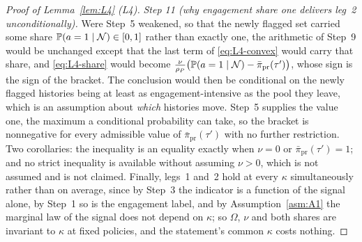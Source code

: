\begin{proof}[Proof of Lemma~\ref{lem:L4} (L4)]
\emph{Step 11 (why engagement share one delivers leg~2 unconditionally).} Were Step~5 weakened, so
that the newly flagged set carried some share $\mathbb{P}(a=1\mid\mathcal N) \in [0,1]$ rather than exactly
one, the arithmetic of Step~9 would be unchanged except that the last term of \eqref{eq:L4-convex}
would carry that share, and \eqref{eq:L4-share} would become
$\tfrac{\nu}{\rho_P}\bigl(\mathbb{P}(a=1\mid\mathcal N)-\bar\pi_{\mathrm{pr}}(\tau')\bigr)$, whose sign is
the sign of the bracket. The conclusion would then be conditional on the newly flagged histories
being at least as engagement-intensive as the pool they leave, which is an assumption about
\emph{which} histories move. Step~5 supplies the value one, the maximum a conditional probability can
take, so the bracket is nonnegative for every admissible value of $\bar\pi_{\mathrm{pr}}(\tau')$ with
no further restriction. Two corollaries: the inequality is an equality exactly when $\nu = 0$ or
$\bar\pi_{\mathrm{pr}}(\tau') = 1$; and no strict inequality is available without assuming
$\nu > 0$, which is not assumed and is not claimed. Finally, legs~1 and~2 hold at every $\kappa$
simultaneously rather than on average, since by Step~3 the indicator is a function of the signal
alone, by Step~1 so is the engagement label, and by Assumption~\ref{asm:A1} the marginal law of the
signal does not depend on $\kappa$; so $\Omega$, $\nu$ and both shares are invariant to $\kappa$ at
fixed policies, and the statement's common $\kappa$ costs nothing.


\end{proof}
